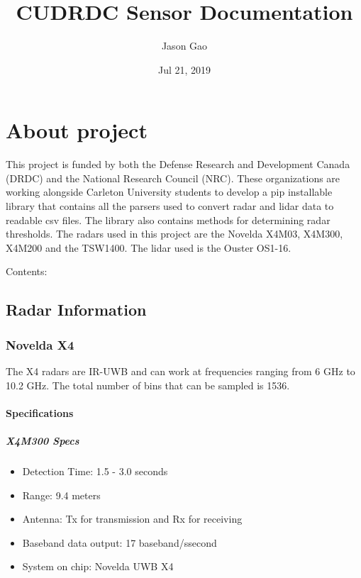 \documentclass[letterpaper,10pt,english]{sphinxmanual}
\title{CUDRDC Sensor Documentation}
\date{Jul 21, 2019}
\author{Jason Gao}
\begin{document}
\pagestyle{empty}
\sphinxmaketitle
\pagestyle{plain}
\sphinxtableofcontents
\pagestyle{normal}
\label{\detokenize{index::doc}}



\chapter{About project}
\label{\detokenize{index:about-project}}
This project is funded by both the Defense Research and Development Canada (DRDC) and the National Research Council (NRC). These organizations are working alongside Carleton University students
to develop a pip installable library that contains all the parsers used to convert radar and lidar data to readable csv files. The library also contains methods for determining radar thresholds.
The radars used in this project are the Novelda X4M03, X4M300, X4M200 and the TSW1400. The lidar used is the Ouster OS1-16.

Contents:


\section{Radar Information}
\label{\detokenize{radar information:radar-information}}\label{\detokenize{radar information::doc}}

\subsection{Novelda X4}
\label{\detokenize{radar information:novelda-x4}}
The X4 radars are IR-UWB and can work at frequencies ranging from 6 GHz to 10.2 GHz. The total number of bins that can be sampled is 1536.


\subsubsection{Specifications}
\label{\detokenize{radar information:specifications}}

\paragraph{X4M300 Specs}
\label{\detokenize{radar information:x4m300-specs}}\begin{itemize}
\item {} 
Detection Time: 1.5 - 3.0 seconds

\item {} 
Range: 9.4 meters

\item {} 
Antenna: Tx for transmission and Rx for receiving

\item {} 
Baseband data output: 17 baseband/ssecond

\item {} 
System on chip: Novelda UWB X4

\end{itemize}
\end{document}
